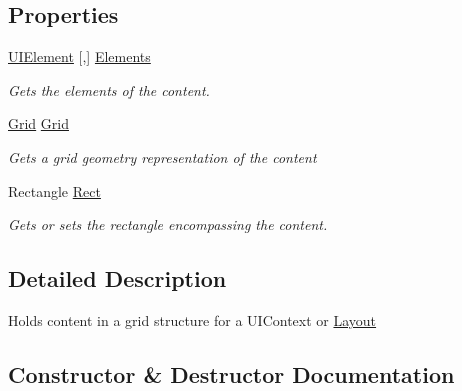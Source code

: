 \subsection*{Properties}
\begin{DoxyCompactItemize}
\item 
\hyperlink{class_midnight_blue_1_1_engine_1_1_u_i_1_1_u_i_element}{U\+I\+Element} \mbox{[},\mbox{]} \hyperlink{class_midnight_blue_1_1_engine_1_1_u_i_1_1_u_i_content_adcd0628a94e0a1e09ab7fe2edace5390}{Elements}
\begin{DoxyCompactList}\small\item\em Gets the elements of the content. \end{DoxyCompactList}\item 
\hyperlink{class_midnight_blue_1_1_engine_1_1_geometry_1_1_grid}{Grid} \hyperlink{class_midnight_blue_1_1_engine_1_1_u_i_1_1_u_i_content_ada50c4f103ff9317b361dc990834fc2c}{Grid}
\begin{DoxyCompactList}\small\item\em Gets a grid geometry representation of the content \end{DoxyCompactList}\item 
Rectangle \hyperlink{class_midnight_blue_1_1_engine_1_1_u_i_1_1_u_i_content_ab91bd11a4e18b9a9716b4e71a9a3508e}{Rect}
\begin{DoxyCompactList}\small\item\em Gets or sets the rectangle encompassing the content. \end{DoxyCompactList}\end{DoxyCompactItemize}


\subsection{Detailed Description}
Holds content in a grid structure for a U\+I\+Context or \hyperlink{class_midnight_blue_1_1_engine_1_1_u_i_1_1_layout}{Layout} 



\subsection{Constructor \& Destructor Documentation}
\hypertarget{class_midnight_blue_1_1_engine_1_1_u_i_1_1_u_i_content_a380a742b33c7fca4877071e8d7fef849}{}\label{class_midnight_blue_1_1_engine_1_1_u_i_1_1_u_i_content_a380a742b33c7fca4877071e8d7fef849} 
